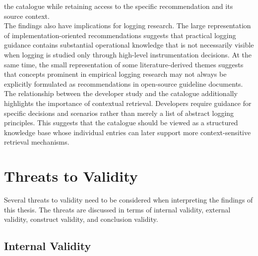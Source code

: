 the catalogue while retaining access to the specific recommendation and its source context.
\\
The findings also have implications for logging research. The large representation of 
implementation-oriented recommendations suggests that practical logging guidance contains 
substantial operational knowledge that is not necessarily visible when logging is studied only 
through high-level instrumentation decisions. At the same time, the small representation of some 
literature-derived themes suggests that concepts prominent in empirical logging research may not 
always be explicitly formulated as recommendations in open-source guideline documents.
\\
The relationship between the developer study and the catalogue additionally highlights the 
importance of contextual retrieval. Developers require guidance for specific decisions and 
scenarios rather than merely a list of abstract logging principles. This suggests that the 
catalogue should be viewed as a structured knowledge base whose individual entries can later 
support more context-sensitive retrieval mechanisms.

\section{Threats to Validity}

Several threats to validity need to be considered when interpreting the findings of
this thesis. The threats are discussed in terms of internal validity, external
validity, construct validity, and conclusion validity.

\subsection{Internal Validity}

